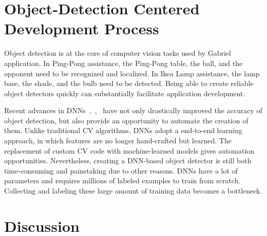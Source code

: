 
\section{Object-Detection Centered Development Process}

Object detection is at the core of computer vision tasks used by Gabriel
application. In Ping-Pong assistance, the Ping-Pong table, the ball, and the
opponent need to be recognized and localized. In Ikea Lamp assistance, the lamp
base, the shade, and the bulb need to be detected. Being able to create reliable
object detectors quickly can substantially facilitate application development.

Recent advances in DNNs~\cite{he2017mask},~\cite{Ren2015},~\cite{He2016} have not
only drastically improved the accuracy of object detection, but also provide an
opportunity to automate the creation of them. Unlike traditional CV algorithms,
DNNs adopt a end-to-end learning approach, in which features are no longer
hand-crafted but learned. The replacement of custom CV code with machine-learned
models gives automation opportunities. Nevertheless, creating a DNN-based object
detector is still both time-consuming and painstaking due to other reasons. DNNs
have a lot of parameters and requires millions of labeled examples to train from
scratch. Collecting and labeling these large amount of training data becomes a
bottleneck.



\section{Discussion}
